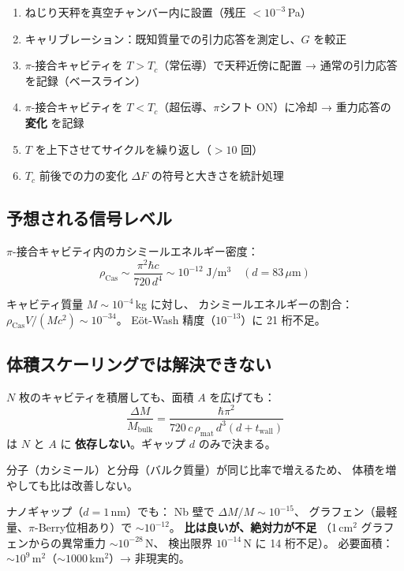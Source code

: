 \documentclass[11pt,a4paper]{article}
\begin{document}
\begin{enumerate}
\item ねじり天秤を真空チャンバー内に設置（残圧 $< 10^{-3}$\,Pa）
\item キャリブレーション：既知質量での引力応答を測定し、$G$ を較正
\item $\pi$-接合キャビティを $T > T_c$（常伝導）で天秤近傍に配置
  → 通常の引力応答を記録（ベースライン）
\item $\pi$-接合キャビティを $T < T_c$（超伝導、$\pi$シフト ON）に冷却
  → 重力応答の \textbf{変化} を記録
\item $T$ を上下させてサイクルを繰り返し（$> 10$ 回）
\item $T_c$ 前後での力の変化 $\Delta F$ の符号と大きさを統計処理
\end{enumerate}

\subsection{予想される信号レベル}

$\pi$-接合キャビティ内のカシミールエネルギー密度：
\begin{equation}
  \rho_{\mathrm{Cas}} \sim \frac{\pi^2 \hbar c}{720\,d^4}
  \sim 10^{-12}\;\mathrm{J/m^3} \quad (d = 83\,\mu\mathrm{m})
\end{equation}

キャビティ質量 $M \sim 10^{-4}$\,kg に対し、
カシミールエネルギーの割合：
$\rho_{\mathrm{Cas}} V / (Mc^2) \sim 10^{-34}$。
Eöt-Wash 精度（$10^{-13}$）に 21 桁不足。

\subsection{体積スケーリングでは解決できない}

\begin{tcolorbox}[colback=red!5,colframe=red!50!black,title=重要な計算結果]
$N$ 枚のキャビティを積層しても、面積 $A$ を広げても：
\begin{equation}
  \frac{\Delta M}{M_{\mathrm{bulk}}}
  = \frac{\hbar \pi^2}{720\,c\,\rho_{\mathrm{mat}}\,d^3(d + t_{\mathrm{wall}})}
\end{equation}
は $N$ と $A$ に \textbf{依存しない}。ギャップ $d$ のみで決まる。

分子（カシミール）と分母（バルク質量）が同じ比率で増えるため、
体積を増やしても比は改善しない。
\end{tcolorbox}

ナノギャップ（$d = 1$\,nm）でも：
Nb 壁で $\Delta M/M \sim 10^{-15}$、
グラフェン（最軽量、$\pi$-Berry位相あり）で $\sim 10^{-12}$。
\textbf{比は良いが、絶対力が不足}
（1\,cm$^2$ グラフェンからの異常重力 $\sim 10^{-28}$\,N、
検出限界 $10^{-14}$\,N に 14 桁不足）。
必要面積：$\sim 10^9$\,m$^2$（$\sim 1000$\,km$^2$）→ 非現実的。
\end{document}
